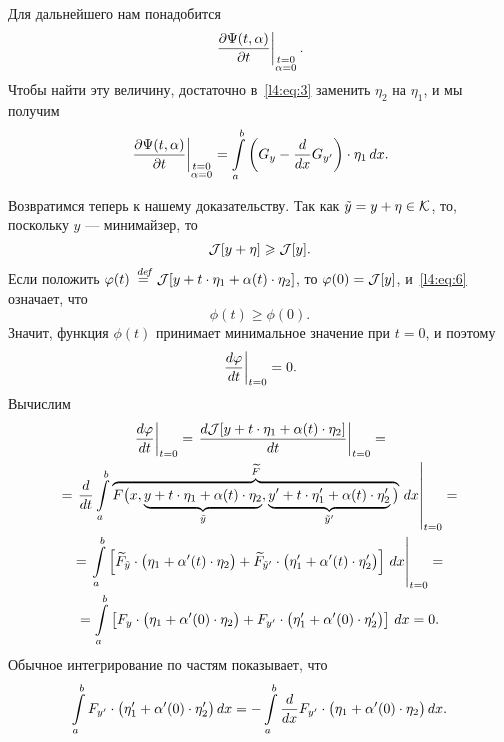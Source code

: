 Для дальнейшего нам понадобится
\begin{equation*}
	\left.\frac{\partial\Psi(t,\alpha)}{\partial t}\right|_{\substack{t=0\\\alpha=0}}.
\end{equation*}
Чтобы найти эту величину{\mb,} достаточно в~\eqref{l4:eq:3} заменить $\eta_2$ на $\eta_1${\mb,} и мы получим 
\begin{equation}
	\label{l4:eq:5}
	\left.\frac{\partial\Psi(t,\alpha)}{\partial t}\right|_{\substack{t=0\\\alpha=0}}=\int\limits_a^b\left(G_y-\frac{d}{dx}G_{y'}\right)\cdot\eta_1\,dx.
\end{equation}

Возвратимся теперь к нашему доказательству. Так как $\tilde{y}=y+\eta\in\mathcal{K}$, то{\mb,} поскольку $y$ --- минимайзер, то 
\begin{equation}
	\label{l4:eq:6}
	\mathcal{J}[y+\eta]\geqslant\mathcal{J}[y].
\end{equation} 
Если положить $\varphi(t)\stackrel{\hspace{0.09 cm}de\!f}{=}\mathcal{J}[y+t\cdot\eta_1+\alpha(t)\cdot\eta_2]$, то $\varphi(0)=\mathcal{J}[y]${\mb,} и~\eqref{l4:eq:6} означает, что 
\begin{equation}
	\label{l4:eq:7}
	\phi(t)\geqslant\phi(0).
\end{equation} 
Значит, функция $\phi(t)$ принимает минимальное значение при $t=0$, и поэтому 
\begin{equation}
	\label{l4:eq:8}
	\left.\frac{d\varphi}{dt}\right|_{t=0}=0.
\end{equation} 
Вычислим
\begin{multline}
	\label{l4:eq:9}
	\left.\frac{d\varphi}{dt}\right|_{t=0}=\left.\frac{d\mathcal{J}[y+t\cdot\eta_1+\alpha(t)\cdot\eta_2]}{dt}\right|_{t=0}=\\=\left.\frac{d}{dt}\int\limits_a^b \overbrace{F\big(x,\underbrace{y+t\cdot\eta_1+\alpha(t)\cdot\eta_2}_{\tilde{y}},\underbrace{y'+t\cdot\eta'_1+\alpha(t)\cdot\eta'_2}_{\tilde{y}'}\big)}^{\widetilde{F}}\,dx\right|_{t=0}=\\
	=\left.\int\limits_a^b\left[\widetilde{F}_{\tilde{y}}\cdot\big(\eta_1+\alpha'(t)\cdot\eta_2\big)+\widetilde{F}_{\tilde{y}'}\cdot\big(\eta'_1+\alpha'(t)\cdot\eta'_2\big)\right]\,dx\right|_{t=0}=\\
	=\int\limits_a^b\left[{F}_{{y}}\cdot\big(\eta_1+\alpha'(0)\cdot\eta_2\big)+{F}_{y'}\cdot\big(\eta'_1+\alpha'(0)\cdot\eta'_2\big)\right]\,dx=0.
\end{multline}
Обычное интегрирование по частям показывает, что
\begin{equation}
	\label{l4:eq:10}
	\int\limits_a^b F_{y'}\cdot\big(\eta'_1+\alpha'(0)\cdot\eta'_2\big)\,dx=-\int\limits_a^b\frac{d}{dx}F_{y'}\cdot\big(\eta_1+\alpha'(0)\cdot\eta_2\big)\,dx.
\end{equation}
